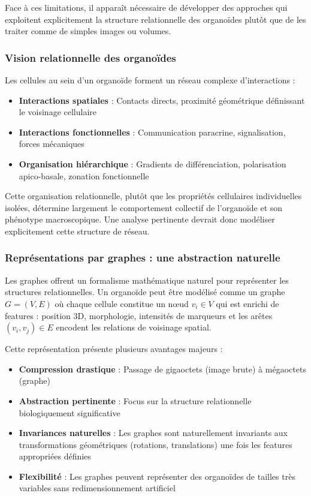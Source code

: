 Face à ces limitations, il apparaît nécessaire de développer des approches qui exploitent explicitement la structure relationnelle des organoïdes plutôt que de les traiter comme de simples images ou volumes.

\subsubsection{Vision relationnelle des organoïdes}

Les cellules au sein d'un organoïde forment un réseau complexe d'interactions :
\begin{itemize}
    \item \textbf{Interactions spatiales} : Contacts directs, proximité géométrique définissant le voisinage cellulaire
    \item \textbf{Interactions fonctionnelles} : Communication paracrine, signalisation, forces mécaniques
    \item \textbf{Organisation hiérarchique} : Gradients de différenciation, polarisation apico-basale, zonation fonctionnelle
\end{itemize}

Cette organisation relationnelle, plutôt que les propriétés cellulaires individuelles isolées, détermine largement le comportement collectif de l'organoïde et son phénotype macroscopique. Une analyse pertinente devrait donc modéliser explicitement cette structure de réseau.

\subsubsection{Représentations par graphes : une abstraction naturelle}

Les graphes offrent un formalisme mathématique naturel pour représenter les structures relationnelles. Un organoïde peut être modélisé comme un graphe $G = (V, E)$ où chaque cellule constitue un nœud $v_i \in V$ qui est enrichi de features : position 3D, morphologie, intensités de marqueurs et les arêtes $(v_i, v_j) \in E$ encodent les relations de voisinage spatial.

Cette représentation présente plusieurs avantages majeurs :
\begin{itemize}
    \item \textbf{Compression drastique} : Passage de gigaoctets (image brute) à mégaoctets (graphe)
    \item \textbf{Abstraction pertinente} : Focus sur la structure relationnelle biologiquement significative
    \item \textbf{Invariances naturelles} : Les graphes sont naturellement invariants aux transformations géométriques (rotations, translations) une fois les features appropriées définies
    \item \textbf{Flexibilité} : Les graphes peuvent représenter des organoïdes de tailles très variables sans redimensionnement artificiel
\end{itemize}

